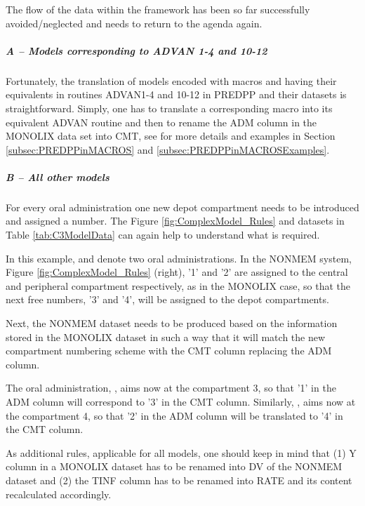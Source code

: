 The flow of the data within the framework \marginpar{\HandCuffLeft}  has been so far 
successfully avoided/neglected and needs to return to the agenda again. 

\subparagraph{A -- Models corresponding to ADVAN 1-4 and 10-12}
Fortunately, the translation of models encoded with macros and having their equivalents 
in routines ADVAN1-4 and 10-12 in PREDPP and their datasets is straightforward. 
Simply, one has to translate a corresponding macro into its equivalent ADVAN 
routine and then to rename the ADM column in the MONOLIX data set into CMT, 
see for more details and examples in Section \ref{subsec:PREDPPinMACROS}
and \ref{subsec:PREDPPinMACROSExamples}.

\subparagraph{B -- All other models}
For every oral administration one new depot compartment needs to be introduced
and assigned a number. The Figure \ref{fig:ComplexModel_Rules} and datasets 
in Table \ref{tab:C3ModelData} can again help to understand what is required. 

In this example,  and  denote two oral administrations. 
In the NONMEM system, Figure \ref{fig:ComplexModel_Rules} (right), '1' and '2' are  
assigned to the central and peripheral compartment respectively, as in the MONOLIX 
case, so that the next free numbers, '3' and '4', will be assigned to the depot 
compartments. 

Next, the NONMEM dataset needs to be produced based on the information stored 
in the MONOLIX dataset in such a way that it will match the new compartment 
numbering scheme with the CMT column replacing the ADM column. 

The oral administration, , aims now at the compartment 3, so that '1' 
in the ADM column will correspond to '3' in the CMT column. Similarly, , 
aims now at the compartment 4, so that '2' in the ADM column will be translated to '4' 
in the CMT column.

As additional rules, applicable for all models, one should keep in mind that 
(1) Y column in a MONOLIX dataset has to be renamed into DV of the NONMEM dataset 
and (2) the TINF column has to be renamed into RATE 
and its content recalculated accordingly. 


